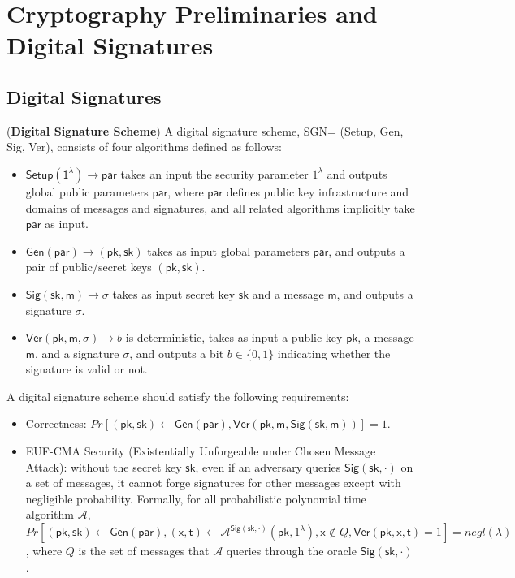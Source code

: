 \section{Cryptography Preliminaries and Digital Signatures} \label{sec:basic}

\subsection{Digital Signatures}

\begin{definition}{(\textbf{Digital Signature Scheme})} A digital signature scheme, {\sffamily SGN= (Setup, Gen, Sig, Ver)}, consists of four algorithms defined as follows: 
\end{definition}
\begin{itemize}
    \item $\mathsf{Setup(1^\lambda) \to par}$ takes an input the security parameter $1^\lambda$ and outputs global public parameters $\mathsf{par}$, where $\mathsf{par}$ defines public key infrastructure and domains of messages and signatures, and all related algorithms implicitly take $\mathsf{par}$ as input.  
    \item $\mathsf{Gen(par)} \to (\mathsf{pk}, \mathsf{sk})$ takes as input global parameters $\mathsf{par}$, and outputs a pair of public/secret keys $(\mathsf{pk}, \mathsf{sk})$. 
    \item $\mathsf{Sig(sk, m)} \to \sigma$ takes as input secret key $\mathsf{sk}$ and a message $\mathsf{m}$, and outputs a signature $\sigma$. 
    \item $\mathsf{Ver}(\mathsf{pk}, \mathsf{m}, \sigma) \to b $ is deterministic, takes as input a public key $\mathsf{pk}$, a message $\mathsf{m}$, and a signature $\sigma$,  and outputs a bit $b\in\{0,1\}$ indicating whether the signature is valid or not. 
\end{itemize}

A digital signature scheme should satisfy the following requirements:
\begin{itemize}
    \item Correctness: $Pr[(\mathsf{pk}, \mathsf{sk})\leftarrow \mathsf{Gen(par)}, \mathsf{Ver(pk, m, Sig(sk, m))}]=1$. 
    \item EUF-CMA Security (Existentially Unforgeable under Chosen Message Attack): without the secret key $\mathsf{sk}$, even if an adversary queries $\mathsf{Sig(sk, \cdot)}$ on a set of messages, it cannot forge signatures for other messages except with negligible probability. Formally, for all probabilistic polynomial time algorithm $\mathcal{A}$, $Pr[(\mathsf{pk}, \mathsf{sk})\leftarrow \mathsf{Gen(par)}, (\mathsf{x},\mathsf{t})\leftarrow \mathcal{A}^{\mathsf{Sig(sk, \cdot)}}(\mathsf{pk}, 1^\lambda), \mathsf{x}\notin Q, \mathsf{Ver(pk, x, t)}=1] = negl(\lambda)$, where $Q$ is the set of messages that $\mathcal{A}$ queries through the oracle $\mathsf{Sig(sk, \cdot)}$. 
    
\end{itemize}

